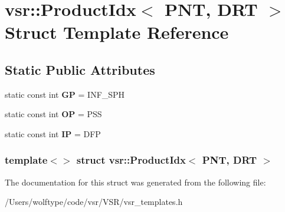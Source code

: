 \hypertarget{structvsr_1_1_product_idx_3_01_p_n_t_00_01_d_r_t_01_4}{\section{vsr\-:\-:Product\-Idx$<$ P\-N\-T, D\-R\-T $>$ Struct Template Reference}
\label{structvsr_1_1_product_idx_3_01_p_n_t_00_01_d_r_t_01_4}
}
\subsection*{Static Public Attributes}
\begin{DoxyCompactItemize}
\item 
\hypertarget{structvsr_1_1_product_idx_3_01_p_n_t_00_01_d_r_t_01_4_a8fdb5b5e013659d5c418b50e7d47a672}{static const int {\bfseries G\-P} = I\-N\-F\-\_\-\-S\-P\-H}\label{structvsr_1_1_product_idx_3_01_p_n_t_00_01_d_r_t_01_4_a8fdb5b5e013659d5c418b50e7d47a672}

\item 
\hypertarget{structvsr_1_1_product_idx_3_01_p_n_t_00_01_d_r_t_01_4_acb07fb0a237b4b87691674b842412db6}{static const int {\bfseries O\-P} = P\-S\-S}\label{structvsr_1_1_product_idx_3_01_p_n_t_00_01_d_r_t_01_4_acb07fb0a237b4b87691674b842412db6}

\item 
\hypertarget{structvsr_1_1_product_idx_3_01_p_n_t_00_01_d_r_t_01_4_ad0e39a96dec31e250eecb60c756c9939}{static const int {\bfseries I\-P} = D\-F\-P}\label{structvsr_1_1_product_idx_3_01_p_n_t_00_01_d_r_t_01_4_ad0e39a96dec31e250eecb60c756c9939}

\end{DoxyCompactItemize}
\subsubsection*{template$<$$>$ struct vsr\-::\-Product\-Idx$<$ P\-N\-T, D\-R\-T $>$}



The documentation for this struct was generated from the following file\-:\begin{DoxyCompactItemize}
\item 
/\-Users/wolftype/code/vsr/\-V\-S\-R/vsr\-\_\-templates.\-h\end{DoxyCompactItemize}
